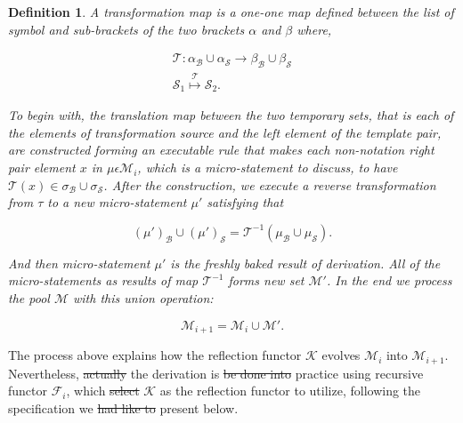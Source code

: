 \documentclass{aims}
\numberwithin{equation}{section}
\newtheorem{definition}{Definition}	%
\numberwithin{theorem}{section}	%
\numberwithin{axiom}{section}	%
\numberwithin{definition}{section}	%
\providecommand{\DIFadd}[1]{{\protect\color{blue}\uwave{#1}}} %
\providecommand{\DIFdel}[1]{{\protect\color{red}\sout{#1}}}                      %
\providecommand{\DIFaddbegin}{} %
\providecommand{\DIFaddend}{} %
\providecommand{\DIFdelbegin}{} %
\providecommand{\DIFdelend}{} %
\begin{document}
	\begin{definition}
		A{ transformation map} is a one-one map defined between the list of symbol and sub-brackets of the two brackets \(\alpha\) and \(\beta\) where,

		\begin{equation}
			\begin{gathered}
				\mathcal{T}:\alpha _{\mathcal{B}}\cup \alpha _{\mathcal{S}}\to \beta _{\mathcal{B}}\cup \beta _{\mathcal{S}}\\
				\mathcal{S}_1\overset{\mathcal{T}}{\mapsto }\mathcal{S}_2.
			\end{gathered}
		\end{equation}

		To begin with, the translation map between the two temporary sets, that is each of the elements of transformation source and the left element of the template pair, are constructed forming an executable rule that makes each non-notation right pair element \(x\) in \(\mu \epsilon \mathcal{M}_i\), which is a micro-statement to discuss, to have \(\mathcal{T}(x)\in \sigma _{\mathcal{B}}\cup \sigma _{\mathcal{S}}\). After the construction, we execute a{ reverse transformation } from \(\tau\) to a new micro-statement \(\mu '\) satisfying that

		\begin{equation}
			(\mu ')_{\mathcal{B}}\cup (\mu ')_{\mathcal{S}} =\mathcal{T}^{-1}\left(\mu _{\mathcal{B}}\cup \mu _{\mathcal{S}}\right).
		\end{equation}

		And then micro-statement \(\mu '\) is the freshly baked result of derivation. All of the micro-statements as results of map \(\mathcal{T}^{-1}\) forms new set \(\mathcal{M}'\). In the end we process the pool \(\mathcal{M}\) with this union operation:

		\[\mathcal{M}_{i+1}=\mathcal{M}_i\cup \mathcal{M}'.\]
	\end{definition}

	The process above explains how the reflection functor \(\mathcal{K}\) evolves \(\mathcal{M}_i\) into \(\mathcal{M}_{i+1}\). Nevertheless, \DIFdelbegin \DIFdel{actually }\DIFdelend the derivation is \DIFdelbegin \DIFdel{be done into }\DIFdelend \DIFaddbegin \DIFadd{to be done in }\DIFaddend practice using recursive functor \(\mathcal{F}_i\), which \DIFdelbegin \DIFdel{select }\DIFdelend \DIFaddbegin \DIFadd{selects }\DIFaddend \(\mathcal{K}\) as the reflection functor to utilize, following the specification we \DIFdelbegin \DIFdel{had like to }\DIFdelend present below.
\end{document}
